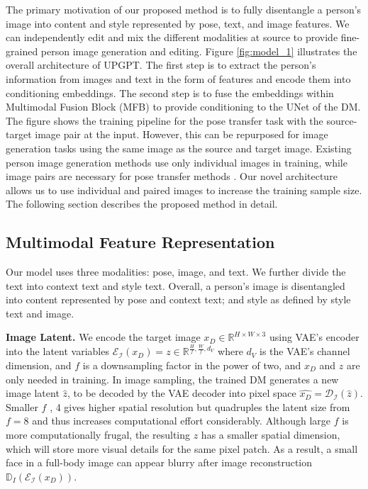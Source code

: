 \documentclass[10pt,twocolumn,letterpaper]{article}
\begin{document}
The primary motivation of our proposed method is to fully disentangle a person's image into content and style represented by pose, text, and image features. We can independently edit and mix the different modalities at source to provide fine-grained person image generation and editing. Figure \ref{fig:model_1} illustrates the overall architecture of UPGPT. The first step is to extract the person's information from images and text in the form of features and encode them into conditioning embeddings. The second step is to fuse the embeddings within Multimodal Fusion Block (MFB) to provide conditioning to the UNet of the DM. The figure shows the training pipeline for the pose transfer task with the source-target image pair at the input. However, this can be repurposed for image generation tasks using the same image as the source and target image. Existing person image generation methods \cite{kpe, text2human, human_diffusion} use only individual images in training, while image pairs are necessary for pose transfer methods \cite{patn, Yang2020, gfla, adgan, pise, casd, nted, persion_dm}. Our novel architecture allows us to use individual and paired images to increase the training sample size. The following section describes the proposed method in detail.

\subsection{Multimodal Feature Representation}
Our model uses three modalities: pose, image, and text. We further divide the text into context text and style text. Overall, a person's image is disentangled into content represented by pose and context text; and style as defined by style text and image.

\noindent\textbf{Image Latent.}
We encode the target image $x_D \in \mathbb{R}^{ H \times W \times 3}$ using VAE's \cite{vae} encoder into the latent variables $\mathcal{E_I}(x_D) = z \in \mathbb{R}^{\frac{H}{f}, \frac{W}{f}, d_{V}}$ where $d_{V}$ is the VAE's channel dimension, and $f$ is a downsampling factor in the power of two, and $x_D$ and $z$ are only needed in training. In image sampling, the trained DM generates a new image latent $\hat{z}$,  to be decoded by the VAE decoder into pixel space $\hat{x_D}=\mathcal{D_I}(\hat{z})$. Smaller $f$ \eg, 4 gives higher spatial resolution but quadruples the latent size from $f=8$ and thus increases computational effort considerably. Although large $f$ is more computationally frugal, the resulting $z$ has a smaller spatial dimension, which will store more visual details for the same pixel patch. As a result, a small face in a full-body image can appear blurry after image reconstruction $\mathbb{D}_I(\mathcal{E_I}(x_D))$. 
\end{document}
